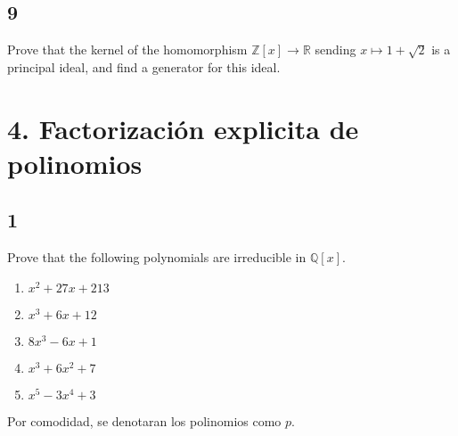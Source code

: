 \documentclass[11pt]{article}
\newcommand{\set}[1]{\mathbb{#1}}
\theoremstyle{definition}
\begin{document}
    \subsection{9}
    Prove that the kernel of the homomorphism $\set{Z}[x]\rightarrow \set{R}$ sending $x\mapsto 1+\sqrt{2}$ is a principal ideal, and find a generator for this ideal.

    \section{4. Factorización explicita de polinomios}
    \subsection{1}
    Prove that the following polynomials are irreducible in $\set{Q}[x]$.
    \begin{enumerate}[label=\textbf{(\alph*)}]
        \item $x^2+27x+213$

        \item $x^3+6x+12$

        \item $8x^3-6x+1$

        \item $x^3+6x^2+7$

        \item $x^5-3x^4+3$
    \end{enumerate}
    Por comodidad, se denotaran los polinomios como $p$.
\end{document}
